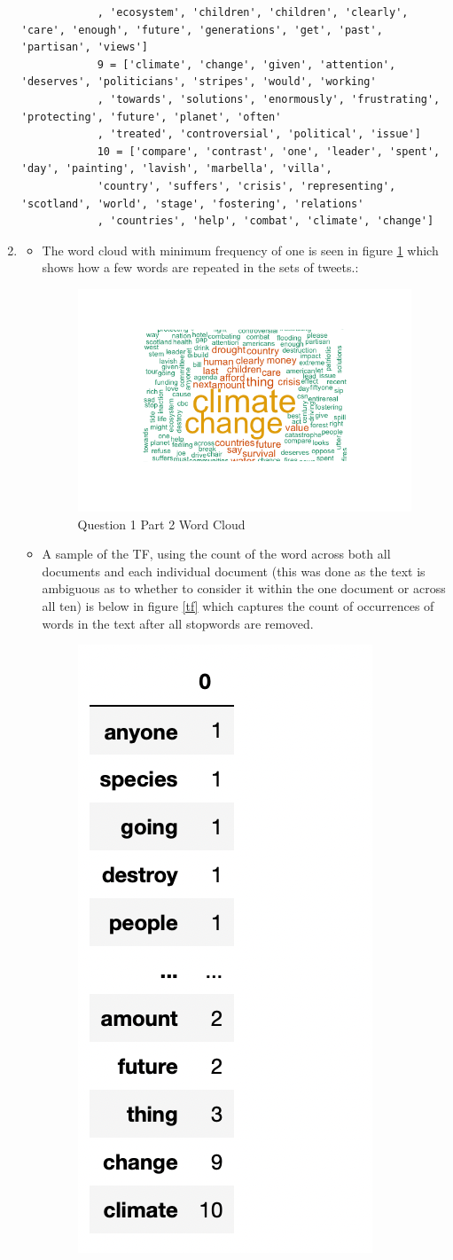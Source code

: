 \documentclass{article}
\begin{document}
\begin{enumerate}
\begin{verbatim}
			, 'ecosystem', 'children', 'children', 'clearly', 'care', 'enough', 'future', 'generations', 'get', 'past', 'partisan', 'views']
			9 = ['climate', 'change', 'given', 'attention', 'deserves', 'politicians', 'stripes', 'would', 'working'
			, 'towards', 'solutions', 'enormously', 'frustrating', 'protecting', 'future', 'planet', 'often'
			, 'treated', 'controversial', 'political', 'issue']
			10 = ['compare', 'contrast', 'one', 'leader', 'spent', 'day', 'painting', 'lavish', 'marbella', 'villa', 
			'country', 'suffers', 'crisis', 'representing', 'scotland', 'world', 'stage', 'fostering', 'relations'
			, 'countries', 'help', 'combat', 'climate', 'change']
		\end{verbatim}
	\item 
		\begin{itemize}
	\item The word cloud with minimum frequency of one is seen in figure \ref{q1p2} which shows how a few words are repeated in the sets of tweets.:
		\begin{figure}[!h]
		\centering
		\includegraphics[width=0.6\linewidth]{climate_change_tweets.png}
		\caption{Question 1 Part 2 Word Cloud}\label{q1p2}
	\end{figure}
	\item A sample of the TF, using the count of the word across both all documents and each individual document (this was done as the text is ambiguous as to whether to consider it within the one document or across all ten) is below in figure \ref{tf} which captures the count of occurrences of words in the text after all stopwords are removed.
			\begin{figure}[!h]
		\centering
		\includegraphics[width=0.2\linewidth]{tf.png}

\end{figure}
\end{itemize}
\end{enumerate}
\end{document}
